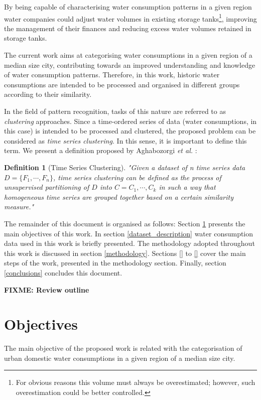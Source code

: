 \documentclass[9pt,journal,compsoc]{IEEEtran}
\newtheorem{mydef}{Definition}
\begin{document}
By being capable of characterising water consumption patterns in a given region water companies could adjust water volumes in existing storage tanks\footnote{For obvious reasons this volume must always be overestimated; however, such overestimation could be better controlled.}, improving the management of their finances and reducing excess water volumes retained in storage tanks.

The current work aims at categorising water consumptions in a given region of a median size city, contributing towards an improved understanding and knowledge of water consumption patterns. Therefore, in this work, historic water consumptions are intended to be processed and organised in different groups according to their similarity.

In the field of pattern recognition, tasks of this nature are referred to as \emph{clustering} approaches. Since a time-ordered series of data (water consumptions, in this case) is intended to be processed and clustered, the proposed problem can be considered as \emph{time series clustering}. In this sense, it is important to define this term. We present a definition proposed by Aghabozorgi \emph{et al.} \cite{aghabozorgi2015time}:

\begin{mydef}[Time Series Clustering]
	"Given a dataset of n time series data $D = \{F_{1}, \cdots , F_{n}\}$, time series clustering can be defined as the process of unsupervised partitioning of $D$ into $C = {C_{1}, \cdots , C_{k}}$ in such a way that homogeneous time series are grouped together based on a certain similarity measure."
\end{mydef}

The remainder of this document is organised as follows: Section \ref{objectives} presents the main objectives of this work. In section \ref{dataset_description} water consumption data used in this work is briefly presented. The methodology adopted throughout this work is discussed in section \ref{methodology}. Sections \ref{} to \ref{} cover the main steps of the work, presented in the methodology section. Finally, section \ref{conclusions} concludes this document.

\textbf{FIXME: Review outline}

\section{Objectives}
\label{objectives}

The main objective of the proposed work is related with the categorisation of urban domestic water consumptions in a given region of a median size city.
\end{document}
